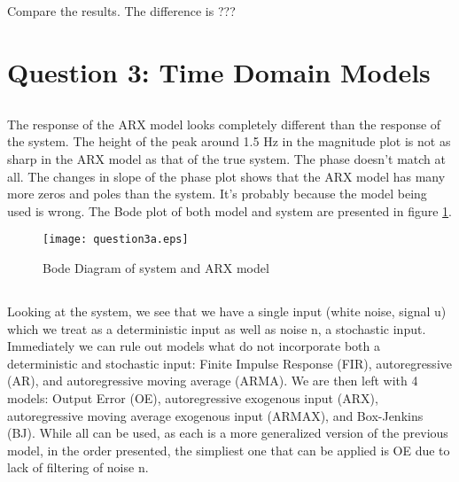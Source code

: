 \documentclass[times,12pt,reqno]{amsart}
\begin{document}
\subsection{}

Compare the results. The difference is ???

\newpage
\section{Question 3: Time Domain Models}

\subsection{}
The response of the ARX model looks completely different than the response of
the system. The height of the peak around 1.5 Hz in the magnitude plot is not
as sharp in the ARX model as that of the true system. The phase doesn't match
at all. The changes in slope of the phase plot shows that the ARX model has
many more zeros and poles than the system. It's probably because the model
being used is wrong. The Bode plot of both model and system are presented in
figure \ref{fig:q3a}.

\begin{figure}
    \begin{center}
        \texttt{[image: question3a.eps]}
    \end{center}
    \caption{Bode Diagram of system and ARX model}
    \label{fig:q3a}
\end{figure}

\subsection{}
Looking at the system, we see that we have a single input (white noise,
signal u) which we treat as a deterministic input as well as noise n, a
stochastic input. Immediately we can rule out models what do not incorporate
both a deterministic and stochastic input: Finite Impulse Response (FIR),
autoregressive (AR), and autoregressive moving average (ARMA). We are then left
with 4 models: Output Error (OE), autoregressive exogenous input (ARX),
autoregressive moving average exogenous input (ARMAX), and Box-Jenkins (BJ).
While all can be used, as each is a more generalized version of the previous
model, in the order presented, the simpliest one that can be applied is OE due
to lack of filtering of noise n.

\subsection{}
\end{document}
